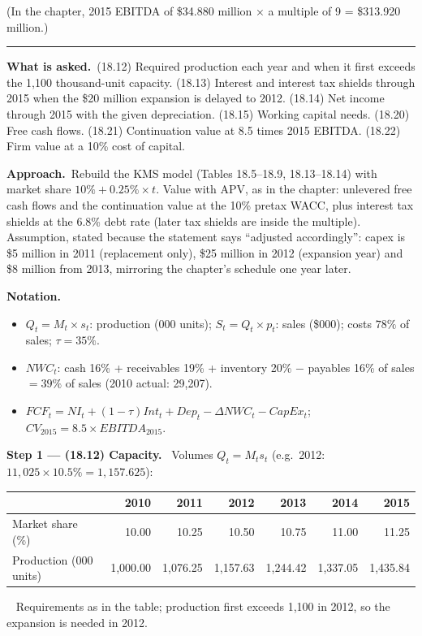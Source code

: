 \documentclass[11pt,a4paper]{article}
\newcommand{\notation}{\par\noindent\textbf{Notation.}}
\newcommand{\step}[2]{\par\medskip\noindent\textbf{Step #1 --- #2.}~}
\newcommand{\asked}{\par\medskip\noindent\textbf{What is asked.}~}
\newcommand{\approach}{\par\smallskip\noindent\textbf{Approach.}~}
\newcommand{\answer}[1]{\par\smallskip\noindent\fbox{\textbf{Answer #1.}}~}
\newcommand{\stmtend}{\par\endgroup\nopagebreak\noindent\rule{\linewidth}{0.4pt}\par\medskip}
\begin{document}
(In the chapter, 2015 EBITDA of \$34.880 million × a multiple of 9 = \$313.920 million.)
\stmtend

\asked (18.12) Required production each year and when it first exceeds the 1,100 thousand-unit
capacity. (18.13) Interest and interest tax shields through 2015 when the \$20 million expansion is
delayed to 2012. (18.14) Net income through 2015 with the given depreciation. (18.15) Working capital
needs. (18.20) Free cash flows. (18.21) Continuation value at 8.5 times 2015 EBITDA. (18.22) Firm value
at a 10\% cost of capital.

\approach Rebuild the KMS model (Tables 18.5--18.9, 18.13--18.14) with market share
$10\%+0.25\%\times t$. Value with APV, as in the chapter: unlevered free cash flows and the continuation
value at the 10\% pretax WACC, plus interest tax shields at the 6.8\% debt rate (later tax shields are
inside the multiple). Assumption, stated because the statement says ``adjusted accordingly'': capex is
\$5 million in 2011 (replacement only), \$25 million in 2012 (expansion year) and \$8 million from 2013,
mirroring the chapter's schedule one year later.

\notation
\begin{itemize}
  \item $Q_t=M_t\times s_t$: production (000 units); $S_t=Q_t\times p_t$: sales (\$000); costs $78\%$ of sales; $\tau=35\%$.
  \item $NWC_t$: cash 16\% + receivables 19\% + inventory 20\% $-$ payables 16\% of sales $=39\%$ of sales (2010 actual: 29,207).
  \item $FCF_t=NI_t+(1-\tau)Int_t+Dep_t-\Delta NWC_t-CapEx_t$; $CV_{2015}=8.5\times EBITDA_{2015}$.
\end{itemize}

\step{1}{(18.12) Capacity} Volumes $Q_t=M_t s_t$ (e.g.\ 2012: $11{,}025\times10.5\%=1{,}157.625$):
\begin{center}\small
\begin{tabular}{lrrrrrr}
\toprule
 & 2010 & 2011 & 2012 & 2013 & 2014 & 2015\\
\midrule
Market share (\%) & 10.00 & 10.25 & 10.50 & 10.75 & 11.00 & 11.25\\
Production (000 units) & 1,000.00 & 1,076.25 & 1,157.63 & 1,244.42 & 1,337.05 & 1,435.84\\
\bottomrule
\end{tabular}
\end{center}
\answer{(18.12)} Requirements as in the table; production first exceeds 1,100 in 2012, so the expansion is needed in 2012.
\end{document}
